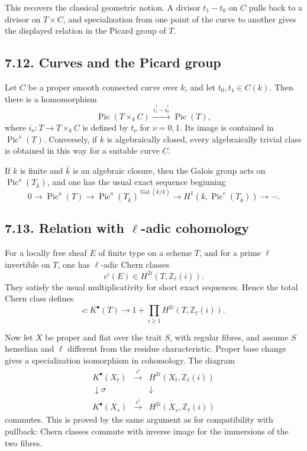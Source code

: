 \documentclass[12pt]{article}
\newcommand{\ZZ}{\mathbb Z}
\newcommand{\Pic}{\operatorname{Pic}}
\newcommand{\xto}[1]{\xrightarrow{#1}}
\newcommand{\longto}{\longrightarrow}
\begin{document}
This recovers the classical geometric notion. A divisor $t_1-t_0$ on $C$ pulls back to a divisor on $T\times C$, and specialization from one point of the curve to another gives the displayed relation in the Picard group of $T$.

\subsection*{7.12. Curves and the Picard group}

Let $C$ be a proper smooth connected curve over $k$, and let $t_0,t_1\in C(k)$. Then there is a homomorphism
\[
\Pic(T\times_k C)\xto{\,i_1^*-i_0^*\,}\Pic(T),
\]
where $i_\nu:T\to T\times_k C$ is defined by $t_\nu$ for $\nu=0,1$. Its image is contained in $\Pic^{\mathrm a}(T)$. Conversely, if $k$ is algebraically closed, every algebraically trivial class is obtained in this way for a suitable curve $C$.

If $k$ is finite and $\bar k$ is an algebraic closure, then the Galois group acts on $\Pic^{\mathrm a}(T_{\bar k})$, and one has the usual exact sequence beginning
\[
0\longto\Pic^{\mathrm a}(T)
\longto\Pic^{\mathrm a}(T_{\bar k})^{\operatorname{Gal}(\bar k/k)}
\longto H^1(k,\Pic^c(T_{\bar k}))\longto\cdots .
\]

\subsection*{7.13. Relation with $\ell$-adic cohomology}

For a locally free sheaf $E$ of finite type on a scheme $T$, and for a prime $\ell$ invertible on $T$, one has $\ell$-adic Chern classes
\[
c^i(E)\in H^{2i}(T,\ZZ_\ell(i)).
\]
They satisfy the usual multiplicativity for short exact sequences. Hence the total Chern class defines
\[
c:K^\bullet(T)\longto
1+\prod_{i\geq1}H^{2i}(T,\ZZ_\ell(i)).
\]

Now let $X$ be proper and flat over the trait $S$, with regular fibres, and assume $S$ henselian and $\ell$ different from the residue characteristic. Proper base change gives a specialization isomorphism in cohomology. The diagram
\[
\begin{array}{ccc}
K^\bullet(X_t)&\xto{\,c^i\,}&H^{2i}(X_t,\ZZ_\ell(i))\\
\downarrow\scriptstyle\sigma&&\downarrow\\
K^\bullet(X_s)&\xto{\,c^i\,}&H^{2i}(X_s,\ZZ_\ell(i))
\end{array}
\]
commutes. This is proved by the same argument as for compatibility with pullback: Chern classes commute with inverse image for the immersions of the two fibres.
\end{document}
